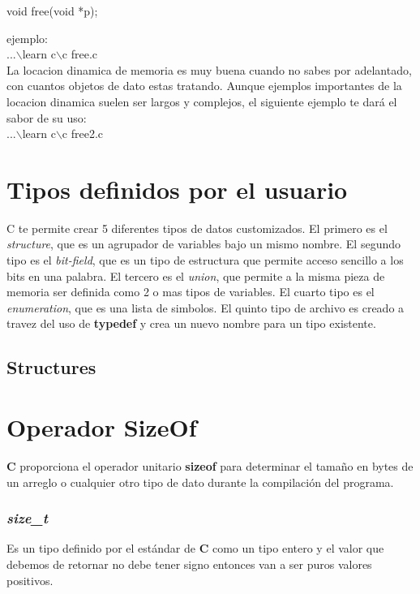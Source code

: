 \documentclass[]{article}
\begin{document}
	void free(void *p);
	
	ejemplo:\\
	
	...$\backslash$learn c$\backslash$c free.c\\
	
	La locacion dinamica de memoria es muy buena cuando no sabes por adelantado, con cuantos objetos de dato estas tratando. Aunque ejemplos importantes de la locacion dinamica suelen ser largos y complejos, el siguiente ejemplo te dará el sabor de su uso:\\
	
	...$\backslash$learn c$\backslash$c free2.c\\
	
	\section{Tipos definidos por el usuario}
	
		C te permite crear 5 diferentes tipos de datos customizados. El primero es el \textit{structure}, que es un agrupador de variables bajo un mismo nombre. El segundo tipo es el \textit{bit-field}, que es un tipo de estructura que permite acceso sencillo a los bits en una palabra. El tercero es el \textit{union}, que permite a la misma pieza de memoria ser definida como 2 o mas tipos de variables. El cuarto tipo es el \textit{enumeration}, que es una lista de simbolos. El quinto tipo de archivo es creado a travez del uso de \textbf{typedef} y crea un nuevo nombre para un tipo existente.
		
		\subsection{Structures}
		
			
	
	\section{Operador SizeOf}
	
	\textbf{C} proporciona el operador unitario \textbf{sizeof} para determinar el tamaño en bytes de un arreglo o cualquier otro tipo de dato durante la compilación del programa.
	
	\subsubsection{\textit{size\_t}}
	
	Es un tipo definido por el estándar de \textbf{C} como un tipo entero y el valor que debemos de retornar no debe tener signo entonces van a ser puros valores positivos.\\
	
\end{document}
